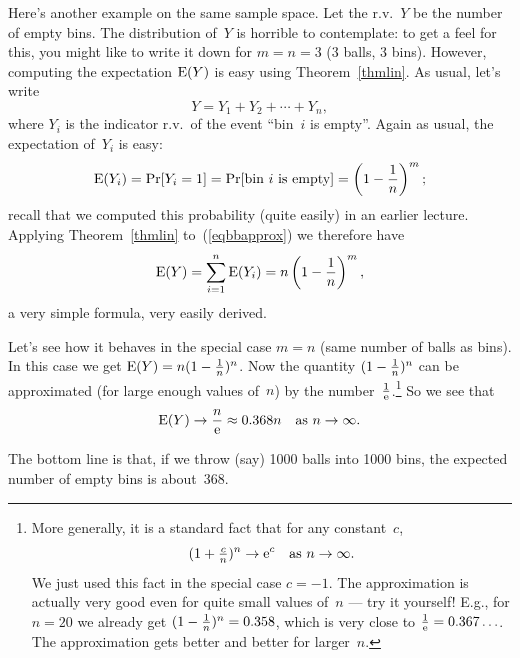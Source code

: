 \documentclass[11pt]{article}
\def\Ex#1{{\rm E}(#1)}
\newcounter{thm}
\begin{document}
\begin{enumerate}
Here's another example on the same sample space.
Let the r.v.~$Y$ be the number of empty bins.  The distribution
of~$Y$ is horrible to contemplate: to get a feel for this, you
might like to write it down for $m=n=3$ (3 balls, 3 bins).  However,
computing the expectation $\Ex{Y}$ is easy using
Theorem~\ref{thmlin}.  As usual, let's write
\begin{equation}\label{eqbbapprox}
   Y=Y_1+Y_2+\cdots+Y_n,
\end{equation}
where $Y_i$ is the indicator r.v.\ of the event ``bin~$i$ is empty''.
Again as usual, the expectation of~$Y_i$ is easy:  $$
   \Ex{Y_i} = \Pr[Y_i=1] = \Pr[\hbox{\rm bin~$i$ is empty}] =
                            \left(1-{1\over n}\right)^m;  $$
recall that we computed this probability (quite easily) in an
earlier lecture.  Applying Theorem~\ref{thmlin} to~(\ref{eqbbapprox})
we therefore have $$
   \Ex{Y} = \sum_{i=1}^n\Ex{Y_i}=n\left(1-{1\over n}\right)^m,  $$
a very simple formula, very easily derived.

Let's see how it behaves in the special case $m=n$ (same number of
balls as bins).  In this case we get $\Ex{Y}=n(1-{1\over n})^n$.
Now the quantity $(1-{1\over n})^n$ can be approximated (for large
enough values of~$n$) by the number~$1\over{\rm e}$.\footnote{More
generally, it is a standard fact that for any constant~$c$, $$
  (1+{\textstyle{c\over n}})^n\to{\rm e}^c\quad\hbox{\rm as $n\to\infty$}. $$
We just used this fact in the special case $c=-1$.  The approximation
is actually very good even for quite small values of~$n$ --- try it
yourself!  E.g., for $n=20$ we already get $(1-{1\over n})^n=0.358$,
which is very close to ${1\over{\rm e}}=0.367\ldots$.  The
approximation gets better and better for larger~$n$.}
So we see that $$
   \Ex{Y}\to{n\over{\rm e}}\approx 0.368n\quad\hbox{\rm as $n\to\infty$}.  $$

The bottom line is that, if we throw (say) 1000 balls into 1000 bins,
the expected number of empty bins is about~368.

\end{enumerate}
\end{document}
